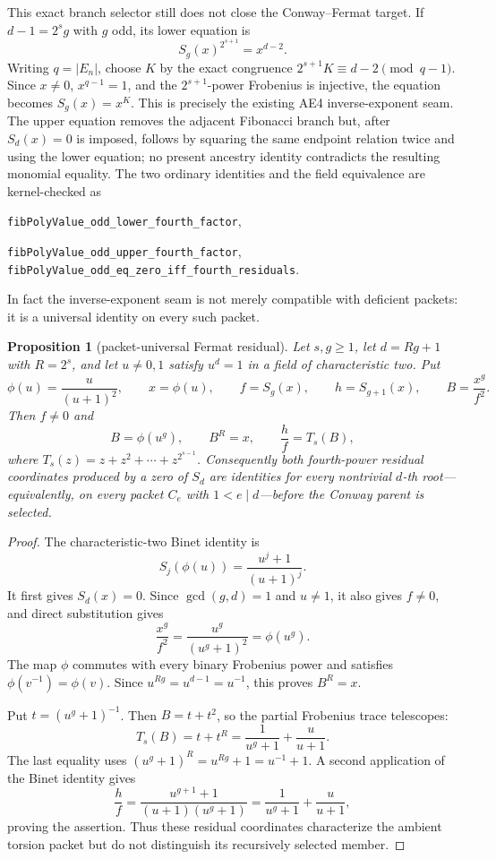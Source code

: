 \documentclass[11pt]{article}
\newtheorem{proposition}[theorem]{Proposition}
\theoremstyle{definition}
\theoremstyle{remark}
\begin{document}
This exact branch selector still does not close the Conway--Fermat target.
If $d-1=2^s g$ with $g$ odd, its lower equation is
\[
 S_g(x)^{2^{s+1}}=x^{d-2}.
\]
Writing $q=|E_n|$, choose $K$ by the exact congruence
$2^{s+1}K\equiv d-2\pmod{q-1}$.  Since $x\ne0$, $x^{q-1}=1$, and the
$2^{s+1}$-power Frobenius is injective, the equation becomes
$S_g(x)=x^K$.  This is precisely the existing AE4 inverse-exponent seam.
The upper equation removes the adjacent Fibonacci branch but, after
$S_d(x)=0$ is imposed, follows by squaring the same endpoint relation twice
and using the lower equation; no present ancestry identity contradicts the
resulting monomial equality.
The two ordinary identities and the field equivalence are kernel-checked as
\begin{center}
\texttt{fibPolyValue\_odd\_lower\_fourth\_factor},\par
\texttt{fibPolyValue\_odd\_upper\_fourth\_factor},\quad{}\quad
\texttt{fibPolyValue\_odd\_eq\_zero\_iff\_fourth\_residuals}.
\end{center}

In fact the inverse-exponent seam is not merely compatible with deficient
packets: it is a universal identity on every such packet.

\begin{proposition}[packet-universal Fermat residual]
\label{prop:z-packet-universal}
Let $s,g\geq1$, let $d=Rg+1$ with $R=2^s$, and let $u\ne0,1$ satisfy
$u^d=1$ in a field of characteristic two.  Put
\[
 \phi(u)=\frac{u}{(u+1)^2},\qquad x=\phi(u),\qquad
 f=S_g(x),\qquad h=S_{g+1}(x),\qquad
 B=\frac{x^g}{f^2}.
\]
Then $f\ne0$ and
\[
 B=\phi(u^g),\qquad B^R=x,
 \qquad \frac hf=T_s(B),
\]
where $T_s(z)=z+z^2+\cdots+z^{2^{s-1}}$.
Consequently both fourth-power residual coordinates produced by a zero of
$S_d$ are identities for every nontrivial $d$-th root---equivalently, on
every packet $C_e$ with $1<e\mid d$---before the Conway parent is selected.
\end{proposition}

\begin{proof}
The characteristic-two Binet identity is
\[
 S_j(\phi(u))=\frac{u^j+1}{(u+1)^j}.
\]
It first gives $S_d(x)=0$.  Since $\gcd(g,d)=1$ and $u\ne1$, it also gives
$f\ne0$, and direct substitution gives
\[
 \frac{x^g}{f^2}=\frac{u^g}{(u^g+1)^2}=\phi(u^g).
\]
The map $\phi$ commutes with every binary Frobenius power and satisfies
$\phi(v^{-1})=\phi(v)$.  Since $u^{Rg}=u^{d-1}=u^{-1}$,
this proves $B^R=x$.

Put $t=(u^g+1)^{-1}$.  Then $B=t+t^2$, so the partial Frobenius trace
telescopes:
\[
 T_s(B)=t+t^R
 =\frac1{u^g+1}+\frac{u}{u+1}.
\]
The last equality uses
$(u^g+1)^R=u^{Rg}+1=u^{-1}+1$.  A second application of the Binet identity
gives
\[
 \frac hf
 =\frac{u^{g+1}+1}{(u+1)(u^g+1)}
 =\frac1{u^g+1}+\frac{u}{u+1},
\]
proving the assertion.  Thus these residual coordinates characterize the
ambient torsion packet but do not distinguish its recursively selected
member.
\end{proof}
\end{document}

